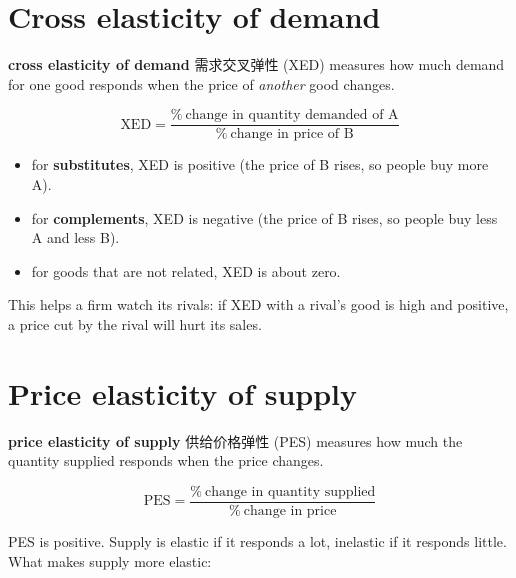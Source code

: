 \documentclass[11pt]{article}
\begin{document}
\section*{Cross elasticity of demand}

\textbf{cross elasticity of demand} 需求交叉弹性 (XED) measures how much demand for one good responds when the price of \emph{another} good changes.

\[
\text{XED} = \frac{\%\ \text{change in quantity demanded of A}}{\%\ \text{change in price of B}}
\]

\begin{itemize}
\item for \textbf{substitutes}, XED is positive (the price of B rises, so people buy more A).

\item for \textbf{complements}, XED is negative (the price of B rises, so people buy less A and less B).

\item for goods that are not related, XED is about zero.

\end{itemize}

This helps a firm watch its rivals: if XED with a rival's good is high and positive, a price cut by the rival will hurt its sales.

\section*{Price elasticity of supply}

\textbf{price elasticity of supply} 供给价格弹性 (PES) measures how much the quantity supplied responds when the price changes.

\[
\text{PES} = \frac{\%\ \text{change in quantity supplied}}{\%\ \text{change in price}}
\]

PES is positive. Supply is elastic if it responds a lot, inelastic if it responds little. What makes supply more elastic:
\end{document}
